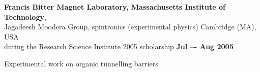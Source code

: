 \documentclass[margin,line]{resume}
\begin{document}
\begin{resume}
    {\bf Francis Bitter Magnet Laboratory, Massachusetts Institute of Technology},\\
    Jagadeesh Moodera Group, spintronics (experimental physics) \hfill Cambridge (MA), USA\\
    during the Research Science Institute 2005 scholarship \hfill {\bf Jul –- Aug 2005}\\
    \begin{list2}
        \vspace*{-4mm}
        \item Experimental work on organic tunnelling barriers.
    \end{list2}

\vspace{3mm}
\newpage



    



\end{resume}
\end{document}
